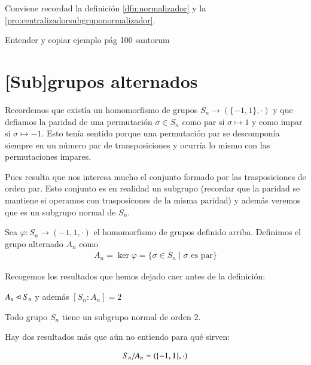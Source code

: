 Conviene recordad la definición \ref{dfn:normalizador} y la \autoref{pro:centralizadorsubgruponormalizador}.

\begin{ej}
	Entender y copiar ejemplo pág 100 santorum
\end{ej}

\section{[Sub]grupos alternados}
\label{sec:gruposalternados}

Recordemos que existía un homomorfismo de grupos $S_n  \to (\{-1, 1\}, \cdot)$ y que defiamos la paridad de una permutación $\sigma \in S_n$ como par si $\sigma \mapsto 1$ y como impar si $\sigma \mapsto -1$. Esto tenía sentido porque una permutación par se descomponía siempre en un número par de transposiciones y ocurría lo mismo con las permutaciones impares.

Pues resulta que nos interesa mucho el conjunto formado por las trasposiciones de orden par. Esto conjunto es en realidad un subgrupo (recordar que la paridad se mantiene si operamos con trasposicones de la misma paridad) y además veremos que es un subgrupo normal de $S_n$.

\begin{dfn}
	Sea $\varphi: S_n \to ({-1, 1}, \cdot)$ el homomorfismo de grupos definido arriba. Definimos el grupo alternado $A_n$ como
	\begin{align*}
	A_n = \ker \varphi = \{\sigma \in S_n \mid \sigma \text{ es par}\}
	\end{align*}
\end{dfn}

Recogemos los resultados que hemos dejado caer antes de la definición:

\begin{pro}
	$A_n \lhd S_n$ y además $[S_n : A_n] = 2$
\end{pro}

\begin{cor}
	Todo grupo $S_n$ tiene un subgrupo normal de orden $2$.
\end{cor}

Hay dos resultados más que aún no entiendo para qué sirven:

\begin{pro}
	\begin{align*}
		S_n / A_n \simeq (\{-1, 1\}, \cdot)
	\end{align*}
\end{pro}

